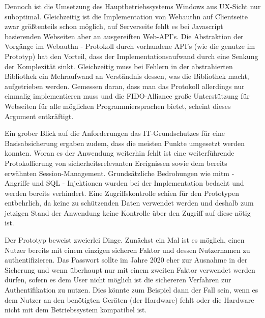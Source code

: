Dennoch ist die Umsetzung des Hauptbetriebssystems Windows aus UX-Sicht nur suboptimal. Gleichzeitig ist die Implementation von Webauthn auf Clientseite zwar größtenteils schon möglich, auf Serverseite fehlt es bei Javascript basierenden Webseiten aber an ausgereiften Web-API's. Die Abstraktion der Vorgänge im Webauthn - Protokoll durch vorhandene API's (wie die genutze im Prototyp) hat den Vorteil, dass der Implementationsaufwand durch eine Senkung der Komplexität sinkt. Gleichzeitig muss bei Fehlern in der abstrahierten Bibliothek ein Mehraufwand an Verständnis dessen, was die Bibliothek macht, aufgetrieben werden. Gemessen daran, dass man das Protokoll allerdings nur einmalig implementieren muss und die FIDO-Alliance große Unterstützung für Webseiten für alle möglichen Programmiersprachen bietet, scheint dieses Argument entkräftigt.



Ein grober Blick auf die Anforderungen das IT-Grundschutzes für eine Basisabsicherung ergaben zudem, dass die meisten Punkte umgesetzt werden konnten. Woran es der Anwendung weiterhin fehlt ist eine weiterführende Protokollierung von sicherheitsrelevanten Ereignissen sowie dem bereits erwähnten Session-Management. Grundsätzliche Bedrohungen wie \ac{mitm} - Angriffe und SQL - Injektionen wurden bei der Implementation bedacht und werden bereits verhindert. Eine Zugriffskontrolle schien für den Prototypen entbehrlich, da keine zu schützenden Daten verwendet werden und deshalb zum jetzigen Stand der Anwendung keine Kontrolle über den Zugriff auf diese nötig ist.

Der Prototyp beweist zweierlei Dinge. Zunächst ein Mal ist es möglich, einen Nutzer bereits mit einem einzigen sicheren Faktor und dessen Nutzernamen zu authentifizieren. Das Passwort sollte im Jahre 2020 eher zur Ausnahme in der Sicherung und wenn überhaupt nur mit einem zweiten Faktor verwendet werden dürfen, sofern es dem User nicht möglich ist die sichereren Verfahren zur Authentifikation zu nutzen. Dies könnte zum Beispiel dann der Fall sein, wenn es dem Nutzer an den benötigten Geräten (der Hardware) fehlt oder die Hardware nicht mit dem Betriebssystem kompatibel ist.
